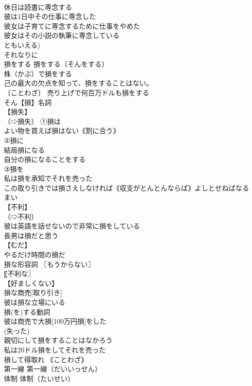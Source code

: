 \documentclass[8pt]{extreport}
\begin{document}
\begin{CJK}{UTF8}{min}
\\	休日は読書に専念する 
\\	彼は1日中その仕事に専念した 
\\	彼女は子育てに専念するために仕事をやめた 
\\	彼女はその小説の執筆に専念している 
\\	ともいえる)
\\	それなりに		
\\	損をする		損をする（そんをする） 
\\	株（かぶ）で損をする 
\\	己の最大の欠点を知って、損をすることはない。 
\\	〔ことわざ〕 売り上げで何百万ドルも損をする 
\\	そん【損】名詞 
\\	【損失】 
\\	（⇨損失） ①損は 
\\	よい物を買えば損はない｟割に合う｠ 
\\	②損に 
\\	結局損になる 
\\	自分の損になることをする 
\\	③損を 
\\	私は損を承知でそれを売った 
\\	この取り引きでは損さえしなければ｟収支がとんとんならば｠よしとせねばなるまい 
\\	【不利】 
\\	（⇨不利） 
\\	彼は英語を話せないので非常に損をしている 
\\	長男は損だと思う 
\\	【むだ】 
\\	やるだけ時間の損だ 
\\	損な形容詞 〖もうからない〗
\\	〖不利な〗
\\	【好ましくない】
\\	損な商売[取り引き] 
\\	彼は損な立場にいる 
\\	損(を)する動詞 
\\	彼は商売で大損[100万円損]をした 
\\	(失った) 
\\	親切にして損をすることはなかろう 
\\	私は20ドル損をしてそれを売った 
\\	損して得取れ ｟ことわざ｠
\\	第一線		第一線（だいいっせん） 
\\	体制		体制（たいせい） 

\end{CJK}
\end{document}
